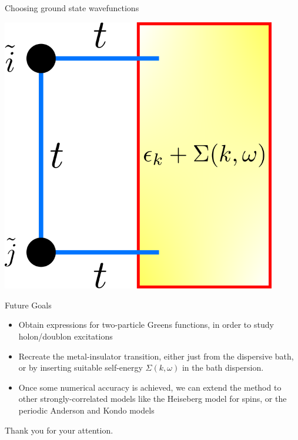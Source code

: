 \documentclass[aspectratio=169]{beamer}
\begin{document}
\begin{frame}{Choosing ground state wavefunctions}
\begin{itemize}
{\begin{minipage}{0.25\textwidth}
			\includegraphics[width=0.9\textwidth]{./dimer_dispersion_selfenergy.png}
		\end{minipage}
	}
\end{itemize}
\end{frame}

\begin{frame}{Future Goals}
	\begin{itemize}
		\item Obtain expressions for two-particle Greens functions, in order to study holon/doublon excitations
		\item Recreate the metal-insulator transition, either just from the dispersive bath, or by inserting suitable self-energy $\Sigma(k,\omega)$ in the bath dispersion.
		\item Once some numerical accuracy is achieved, we can extend the method to other strongly-correlated models like the Heiseberg model for spins, or the periodic Anderson and Kondo models
	\end{itemize}
\end{frame}

\begin{frame}
	\centering
	\Large
	Thank you for your attention.
\end{frame}
\end{document}
